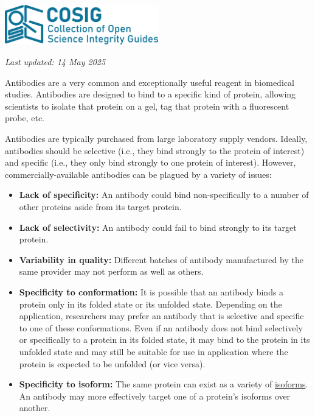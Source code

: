 \documentclass[letterpaper, 12pt]{article}
\begin{document}
\flushleft\includegraphics[width=0.5\textwidth]{img/home/241017_final_logo_mockup.png}

\textit{Last updated: 14 May 2025}

Antibodies are a very common and exceptionally useful reagent in biomedical studies. Antibodies are designed to bind to a specific kind of protein, allowing scientists to isolate that protein on a gel, tag that protein with a fluorescent probe, etc.

Antibodies are typically purchased from large laboratory supply vendors. Ideally, antibodies should be selective (i.e., they bind strongly to the protein of interest) and specific (i.e., they only bind strongly to one protein of interest). However, commercially-available antibodies can be plagued by a variety of issues:

\begin{itemize}
    \setlength\itemsep{-0.5em}
    \item \textbf{Lack of specificity:} An antibody could bind non-specifically to a number of other proteins aside from its target protein.
    \item \textbf{Lack of selectivity:} An antibody could fail to bind strongly to its target protein.
    \item \textbf{Variability in quality:} Different batches of antibody manufactured by the same provider may not perform as well as others.
    \item \textbf{Specificity to conformation:} It is possible that an antibody binds a protein only in its folded state or its unfolded state. Depending on the application, researchers may prefer an antibody that is selective and specific to one of these conformations. Even if an antibody does not bind selectively or specifically to a protein in its folded state, it may bind to the protein in its unfolded state and may still be suitable for use in application where the protein is expected to be unfolded (or vice versa).
    \item \textbf{Specificity to isoform:} The same protein can exist as a variety of \href{https://en.wikipedia.org/wiki/Protein_isoform}{isoforms}. An antibody may more effectively target one of a protein's isoforms over another.
\end{itemize}
\end{document}
